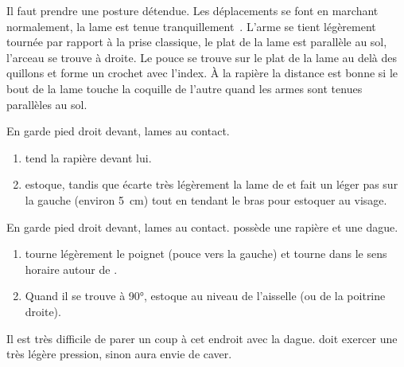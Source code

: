 Il faut prendre une posture détendue.
Les déplacements se font en marchant normalement, la lame est tenue tranquillement~\cite{guidoux:dijon:thibault:2015}.
L'arme se tient légèrement tournée par rapport à la prise classique, le plat de la lame est parallèle au sol, l'arceau se trouve à droite. Le pouce se trouve sur le plat de la lame au delà des quillons et forme un crochet avec l'index.
À la rapière la distance est bonne si le bout de la lame touche la coquille de l'autre quand les armes sont tenues parallèles au sol.


\begin{technique}

En garde pied droit devant, lames au contact.

\begin{enumerate}
	\item \A tend la rapière devant lui.
	\item \A estoque, tandis que \D écarte très légèrement la lame de \A et fait un léger pas sur la gauche (environ \SI{5}{cm}) tout en tendant le bras pour estoquer au visage.
\end{enumerate}

\end{technique}


\begin{technique}

En garde pied droit devant, lames au contact.
\D possède une rapière et une dague.

\begin{enumerate}
	\item \A tourne légèrement le poignet (pouce vers la gauche) et tourne dans le sens horaire autour de \D.
	\item Quand il se trouve à 90°, \A estoque \D au niveau de l'aisselle (ou de la poitrine droite).
\end{enumerate}

Il est très difficile de parer un coup à cet endroit avec la dague.
\A doit exercer une très légère pression, sinon \D aura envie de caver.

\end{technique}



